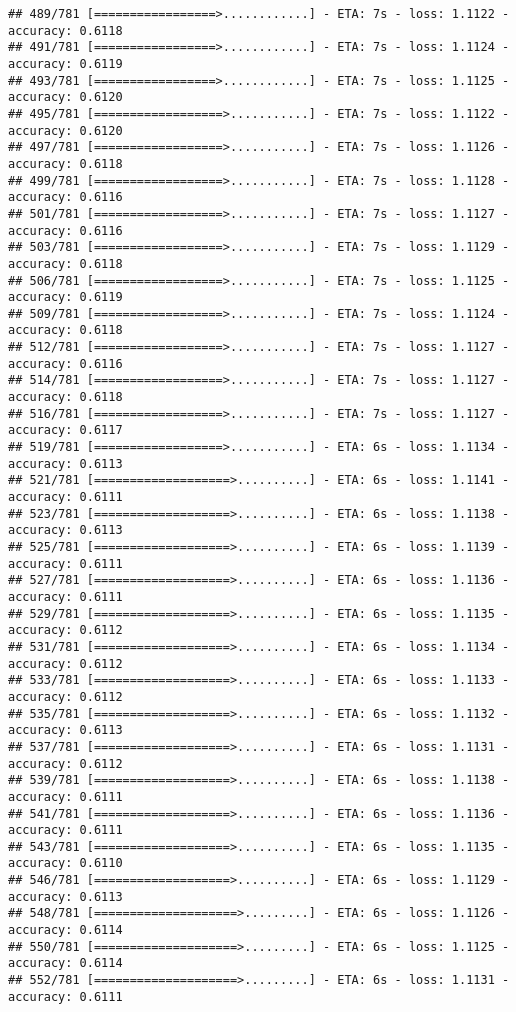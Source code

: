 \documentclass[
]{article}
\begin{document}
\begin{verbatim}
## 489/781 [=================>............] - ETA: 7s - loss: 1.1122 - accuracy: 0.6118
## 491/781 [=================>............] - ETA: 7s - loss: 1.1124 - accuracy: 0.6119
## 493/781 [=================>............] - ETA: 7s - loss: 1.1125 - accuracy: 0.6120
## 495/781 [==================>...........] - ETA: 7s - loss: 1.1122 - accuracy: 0.6120
## 497/781 [==================>...........] - ETA: 7s - loss: 1.1126 - accuracy: 0.6118
## 499/781 [==================>...........] - ETA: 7s - loss: 1.1128 - accuracy: 0.6116
## 501/781 [==================>...........] - ETA: 7s - loss: 1.1127 - accuracy: 0.6116
## 503/781 [==================>...........] - ETA: 7s - loss: 1.1129 - accuracy: 0.6118
## 506/781 [==================>...........] - ETA: 7s - loss: 1.1125 - accuracy: 0.6119
## 509/781 [==================>...........] - ETA: 7s - loss: 1.1124 - accuracy: 0.6118
## 512/781 [==================>...........] - ETA: 7s - loss: 1.1127 - accuracy: 0.6116
## 514/781 [==================>...........] - ETA: 7s - loss: 1.1127 - accuracy: 0.6118
## 516/781 [==================>...........] - ETA: 7s - loss: 1.1127 - accuracy: 0.6117
## 519/781 [==================>...........] - ETA: 6s - loss: 1.1134 - accuracy: 0.6113
## 521/781 [===================>..........] - ETA: 6s - loss: 1.1141 - accuracy: 0.6111
## 523/781 [===================>..........] - ETA: 6s - loss: 1.1138 - accuracy: 0.6113
## 525/781 [===================>..........] - ETA: 6s - loss: 1.1139 - accuracy: 0.6111
## 527/781 [===================>..........] - ETA: 6s - loss: 1.1136 - accuracy: 0.6111
## 529/781 [===================>..........] - ETA: 6s - loss: 1.1135 - accuracy: 0.6112
## 531/781 [===================>..........] - ETA: 6s - loss: 1.1134 - accuracy: 0.6112
## 533/781 [===================>..........] - ETA: 6s - loss: 1.1133 - accuracy: 0.6112
## 535/781 [===================>..........] - ETA: 6s - loss: 1.1132 - accuracy: 0.6113
## 537/781 [===================>..........] - ETA: 6s - loss: 1.1131 - accuracy: 0.6112
## 539/781 [===================>..........] - ETA: 6s - loss: 1.1138 - accuracy: 0.6111
## 541/781 [===================>..........] - ETA: 6s - loss: 1.1136 - accuracy: 0.6111
## 543/781 [===================>..........] - ETA: 6s - loss: 1.1135 - accuracy: 0.6110
## 546/781 [===================>..........] - ETA: 6s - loss: 1.1129 - accuracy: 0.6113
## 548/781 [====================>.........] - ETA: 6s - loss: 1.1126 - accuracy: 0.6114
## 550/781 [====================>.........] - ETA: 6s - loss: 1.1125 - accuracy: 0.6114
## 552/781 [====================>.........] - ETA: 6s - loss: 1.1131 - accuracy: 0.6111

\end{verbatim}
\end{document}
